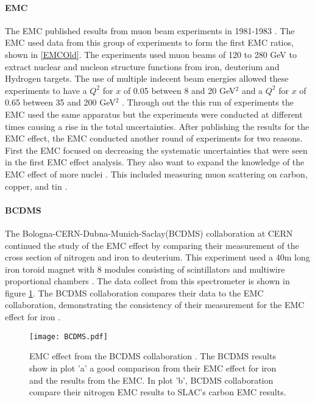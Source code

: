 \paragraph{EMC} The EMC published results from muon beam experiments in 1981-1983 \cite{EM,EMC_iron,CERN_EMC,EMC_F2d}.  The EMC used data from this group of experiments to form the first EMC ratios, shown in \ref{EMCOld}. The experiments used muon beams of 120 to 280 GeV to extract nuclear and nucleon structure functions from iron, deuterium and Hydrogen targets. The use of multiple indecent beam energies allowed these experiments to have a $Q^2$ for $x$ of 0.05 between 8 and 20 GeV$^2$ and a $Q^2$ for $x$ of 0.65 between 35 and 200 GeV$^2$ \cite{CERN_EMC}. Through out the this run of experiments the EMC used the same apparatus but the experiments were conducted at different times causing a rise in the total uncertainties. After publishing the results for the EMC effect, the EMC conducted another round of experiments for two reasons. First the EMC focused on decreasing the systematic uncertainties that were seen in the first EMC effect analysis. They also want to expand the knowledge of the EMC effect of more nuclei \cite{EMC_ext, Ajth}. This included measuring muon scattering on carbon, copper, and tin \cite{EMC_ext}.

\paragraph{BCDMS}The Bologna-CERN-Dubna-Munich-Saclay(BCDMS) collaboration at CERN continued the study of the EMC effect by comparing their measurement of the cross section of nitrogen and iron to deuterium. This experiment used a 40m long iron toroid magnet with 8 modules consisting of scintillators and multiwire proportional chambers \cite{BCDMS}. The data collect from this spectrometer is shown in figure \ref{fig:BCDMS}. The BCDMS collaboration compares their data to the EMC collaboration, demonstrating the consistency of their measurement for the EMC effect for iron \cite{BCDMS,Norton}.
\begin{figure}[h]
	\caption{EMC effect from the BCDMS collaboration \cite{BCDMS}. The BCDMS results show in plot 'a' a good comparison from their EMC effect for iron and the results from the EMC. In plot 'b', BCDMS collaboration compare their nitrogen EMC results to SLAC's carbon EMC results.}
	\label{fig:BCDMS}
	\centering
	\texttt{[image: BCDMS.pdf]}
\end{figure}

